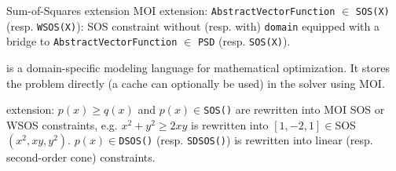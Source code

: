 \documentclass[final]{beamer}
\newlength{\onecolwid}
\begin{document}
\begin{frame}[t,fragile]
\begin{columns}[t]
\begin{column}{\onecolwid}
\begin{block}{Sum-of-Squares extension}
    MOI extension:
        \texttt{AbstractVectorFunction} $\in$ \texttt{SOS(X)} (resp. \texttt{WSOS(X)}):
        SOS constraint without (resp. with) \texttt{domain}
        equipped with a bridge to \texttt{AbstractVectorFunction} $\in$ \texttt{PSD} (resp. \texttt{SOS(X)}).

    \begin{alertblock}{\JuMP{}}
      \JuMP{} is a domain-specific modeling language for mathematical optimization.
      It stores the problem directly (a cache can optionally be used) in the solver
      using MOI. %
    \end{alertblock}

    \JuMP{} extension:
        $p(x) \ge q(x)$ and $p(x) \in {}$\texttt{SOS()} are rewritten into
        MOI SOS or WSOS constraints, e.g.
        $x^2 + y^2 \ge 2xy$ is rewritten into
        $[1, -2, 1] \in {}$SOS$(x^2, xy, y^2)$.
        $p(x) \in {}$\texttt{DSOS()} (resp. \texttt{SDSOS()}) is rewritten into
        linear (resp. second-order cone) constraints.



\end{block}
\end{column}
\end{columns}
\end{frame}
\end{document}
